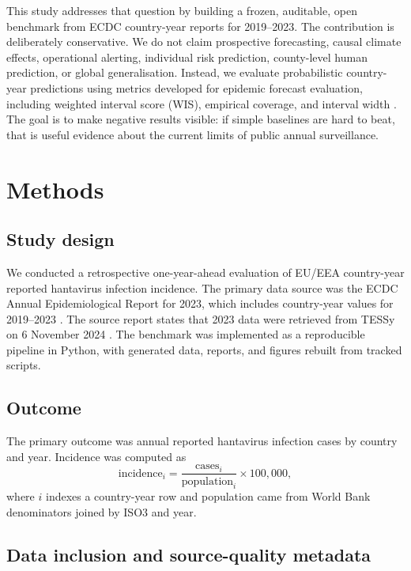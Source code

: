 \documentclass[11pt]{article}
\begin{document}
This study addresses that question by building a frozen, auditable, open benchmark from ECDC country-year reports for 2019--2023. The contribution is deliberately conservative. We do not claim prospective forecasting, causal climate effects, operational alerting, individual risk prediction, county-level human prediction, or global generalisation. Instead, we evaluate probabilistic country-year predictions using metrics developed for epidemic forecast evaluation, including weighted interval score (WIS), empirical coverage, and interval width \cite{bracher_2021}. The goal is to make negative results visible: if simple baselines are hard to beat, that is useful evidence about the current limits of public annual surveillance.

\section{Methods}

\subsection{Study design}

We conducted a retrospective one-year-ahead evaluation of EU/EEA country-year reported hantavirus infection incidence. The primary data source was the ECDC Annual Epidemiological Report for 2023, which includes country-year values for 2019--2023 \cite{ecdc_2023_hantavirus}. The source report states that 2023 data were retrieved from TESSy on 6 November 2024 \cite{ecdc_2023_hantavirus}. The benchmark was implemented as a reproducible pipeline in Python, with generated data, reports, and figures rebuilt from tracked scripts.

\subsection{Outcome}

The primary outcome was annual reported hantavirus infection cases by country and year. Incidence was computed as
\[
\mathrm{incidence}_{i} = \frac{\mathrm{cases}_{i}}{\mathrm{population}_{i}} \times 100{,}000,
\]
where \(i\) indexes a country-year row and population came from World Bank denominators joined by ISO3 and year.

\subsection{Data inclusion and source-quality metadata}
\end{document}

